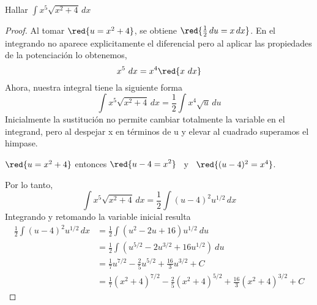 \begin{Ejemplo} Hallar $\displaystyle\int x^5 \sqrt{x^2+4}\,dx$  \end{Ejemplo}
 \begin{proof}
Al tomar $\red{u=x^{2}+4}$,  se obtiene   $\red{\frac{1}{2}\,du=x\,dx}$. En el integrando no aparece explicitamente el diferencial pero  al aplicar las  propiedades de la potenciaci\'on lo obtenemos,
$$x^5 \ dx=x^4\red{ x\ dx}$$
Ahora, nuestra integral tiene la siguiente forma
 $$\displaystyle\int x^5 \sqrt{x^2+4}\,dx= \frac{1}{2}\displaystyle\int x^{4}  \sqrt{u}\,du$$
Inicialmente la sustituci\'on no permite cambiar totalmente la variable en el integrand, pero al despejar x en términos de u y elevar al cuadrado superamos el himpase.
\begin{center}
 $\red{u=x^{2}+4}$ entonces $\displaystyle
\red{u-4=x^2 }$ \  y \ $\red{(u-4)^2 =x^4} $.\end{center}

Por lo tanto,
$$\int  x^5 \sqrt{x^2+4}  \,dx= \frac{1}{2}\int  (u-4)^2 u^{1/2} \,dx $$
Integrando y retomando la variable inicial resulta
\begin{align*}
 \frac{1}{2}\int  (u-4)^2 u^{1/2} \,dx &=\frac{1}{2}\int (u^2-2u+16)u^{1/2} \ du \\
& = \frac{1}{2}\int (u^{5/2}-2u^{3/2}+16u^{1/2})\ du\\
& =\frac{1}{7}u^{7/2}-\frac{2}{5}u^{5/2}+\frac{16}{3}u^{3/2}+C \\
&=\frac{1}{7}(x^{2}+4)^{7/2}-\frac{2}{5}(x^{2}+4)^{5/2}+\frac{16}{3}(x^{2}+4)^{3/2}+C
\end{align*}
\end{proof}



%

   

